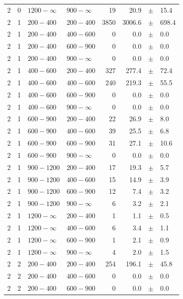 \begin{table}[!h]
\begin{tabular}{rrllrrcl}
2 & 0 & $1200- \infty$ & $900-\infty$ &     19 &     20.9 &$\pm$&   15.4 \\
2 & 1 & $ 200- 400$ & $200-400$ &   3850 &   3006.6 &$\pm$&  698.4 \\
2 & 1 & $ 200- 400$ & $400-600$ &      0 &      0.0 &$\pm$&    0.0 \\
2 & 1 & $ 200- 400$ & $600-900$ &      0 &      0.0 &$\pm$&    0.0 \\
2 & 1 & $ 200- 400$ & $900-\infty$ &      0 &      0.0 &$\pm$&    0.0 \\
2 & 1 & $ 400- 600$ & $200-400$ &    327 &    277.4 &$\pm$&   72.4 \\
2 & 1 & $ 400- 600$ & $400-600$ &    240 &    219.3 &$\pm$&   55.5 \\
2 & 1 & $ 400- 600$ & $600-900$ &      0 &      0.0 &$\pm$&    0.0 \\
2 & 1 & $ 400- 600$ & $900-\infty$ &      0 &      0.0 &$\pm$&    0.0 \\
2 & 1 & $ 600- 900$ & $200-400$ &     22 &     26.9 &$\pm$&    8.0 \\
2 & 1 & $ 600- 900$ & $400-600$ &     39 &     25.5 &$\pm$&    6.8 \\
2 & 1 & $ 600- 900$ & $600-900$ &     31 &     27.1 &$\pm$&   10.6 \\
2 & 1 & $ 600- 900$ & $900-\infty$ &      0 &      0.0 &$\pm$&    0.0 \\
2 & 1 & $ 900-1200$ & $200-400$ &     17 &     19.3 &$\pm$&    5.7 \\
2 & 1 & $ 900-1200$ & $400-600$ &     15 &     14.9 &$\pm$&    3.9 \\
2 & 1 & $ 900-1200$ & $600-900$ &     12 &      7.4 &$\pm$&    3.2 \\
2 & 1 & $ 900-1200$ & $900-\infty$ &      6 &      3.2 &$\pm$&    2.1 \\
2 & 1 & $1200- \infty$ & $200-400$ &      1 &      1.1 &$\pm$&    0.5 \\
2 & 1 & $1200- \infty$ & $400-600$ &      6 &      3.4 &$\pm$&    1.1 \\
2 & 1 & $1200- \infty$ & $600-900$ &      1 &      2.1 &$\pm$&    0.9 \\
2 & 1 & $1200- \infty$ & $900-\infty$ &      4 &      2.0 &$\pm$&    1.5 \\
2 & 2 & $ 200- 400$ & $200-400$ &    254 &    196.1 &$\pm$&   45.8 \\
2 & 2 & $ 200- 400$ & $400-600$ &      0 &      0.0 &$\pm$&    0.0 \\
2 & 2 & $ 200- 400$ & $600-900$ &      0 &      0.0 &$\pm$&    0.0 \\

\end{tabular}
\end{table}
